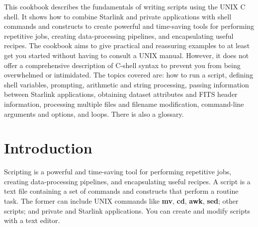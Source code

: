 
This cookbook describes the fundamentals of writing scripts using
the UNIX C shell.  It shows how to combine Starlink and private applications
with shell commands and constructs to create powerful and time-saving
tools for performing repetitive jobs, creating data-processing
pipelines, and encapsulating useful recipes.  The cookbook aims to give
practical and reassuring examples to at least get you started without
having to consult a UNIX manual.  However, it does not offer a
comprehensive description of C-shell syntax to prevent you from
being overwhelmed or intimidated.  The topics covered are: how to run a
script, defining shell variables, prompting, arithmetic and string
processing, passing information between Starlink applications, obtaining
dataset attributes and FITS header information, processing multiple
files and filename modification, command-line arguments and options, and
loops.  There is also a glossary.

 \newpage
 \begin{latexonly}
   \setlength{\parskip}{0mm}
   \latexonlytoc
   \setlength{\parskip}{\medskipamount}
   \markboth{\stardocname}{\stardocname}
 \end{latexonly}
\cleardoublepage
\renewcommand{\thepage}{\arabic{page}}
\setcounter{page}{1}


\section{Introduction\label{sc4_se_intro}}

Scripting is a powerful and time-saving tool for performing repetitive
jobs, creating data-processing pipelines, and encapsulating useful
recipes.  A script is a text file containing a set of
 commands and constructs that perform
a routine task.  The former can include UNIX commands like {\bf mv},
{\bf cd}, {\bf awk}, {\bf sed}; other scripts; and private and
Starlink applications.  You can create and modify scripts with a text
editor.

